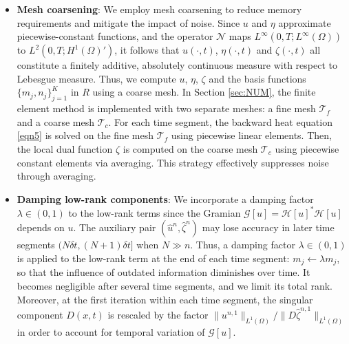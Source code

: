 \documentclass[onefignum,onetabnum]{siamart190516}
\numberwithin{equation}{section}
\begin{document}
\begin{itemize}
\item \textbf{Mesh coarsening}:
We employ mesh coarsening to reduce memory requirements and mitigate the impact of noise.
Since $u$ and $\eta$ approximate piecewise-constant functions, and the operator $\mathcal{N}$ maps $L^\infty(0,T;L^\infty(\Omega))$ to $L^2(0,T;H^1(\Omega)')$, it follows that $u(\cdot,t)$, $\eta(\cdot,t)$ and $\zeta(\cdot,t)$ all constitute a finitely additive, absolutely continuous measure with respect to Lebesgue measure.
Thus, we compute $u$, $\eta$, $\zeta$ and the basis functions $\{m_j, n_j\}_{j=1}^K$ in $R$ using a coarse mesh.
In Section \ref{sec:NUM}, the finite element method is implemented with two separate meshes: a fine mesh $\mathscr{T}_{f}$ and a coarse mesh $\mathscr{T}_{c}$.
For each time segment, the backward heat equation \eqref{eqn5} is solved on the fine mesh $\mathscr{T}_{f}$ using piecewise linear elements.
Then, the local dual function $\zeta$ is computed on the coarse mesh $\mathscr{T}_{c}$ using piecewise constant elements via averaging.
This strategy effectively suppresses noise through averaging.

\item \textbf{Damping low-rank components}:
We incorporate a damping factor $\lambda \in (0,1)$ to the low-rank terms since the Gramian $\mathcal{G}[u] = \mathcal{H}[u]^{*}\mathcal{H}[u]$ depends on $u$.
The auxiliary pair $(\hat{u}^{n}, \hat{\zeta}^{n})$ may lose accuracy in later time segments $(N \delta t, (N + 1)\delta t]$ when $N \gg n$.
Thus, a damping factor $\lambda\in(0,1)$ is applied to the low-rank term at the end of each time segment: $m_{j} \leftarrow \lambda m_{j}$, so that the influence of outdated information diminishes over time.
It becomes negligible after several time segments, and we limit its total rank.
Moreover, at the first iteration within each time segment, the singular component $D(x,t)$ is rescaled by the factor ${\|u^{n,1}\|_{L^{1}(\Omega)}}/{\|D\hat{\zeta}^{n,1}\|_{L^{1}(\Omega)}}$ in order to account for temporal variation of  $\mathcal{G}[u]$.


\end{itemize}
\end{document}
